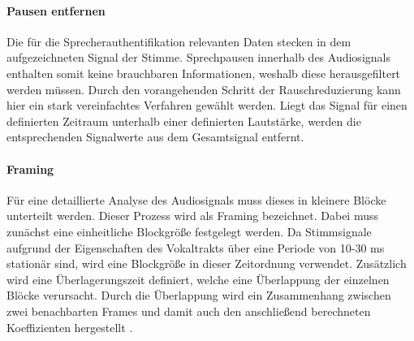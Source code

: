 \paragraph{Pausen entfernen}
Die für die Sprecherauthentifikation relevanten Daten stecken in dem aufgezeichneten Signal der Stimme.
Sprechpausen innerhalb des Audiosignals enthalten somit keine brauchbaren Informationen, weshalb diese herausgefiltert werden müssen.
Durch den vorangehenden Schritt der Rauschreduzierung kann hier ein stark vereinfachtes Verfahren gewählt werden.
Liegt das Signal für einen definierten Zeitraum unterhalb einer definierten Lautstärke, werden die entsprechenden Signalwerte aus dem Gesamtsignal entfernt.

\paragraph{Framing}\label{sec:Framing}
Für eine detaillierte Analyse des Audiosignals muss dieses in kleinere Blöcke unterteilt werden.
Dieser Prozess wird als Framing bezeichnet.
Dabei muss zunächst eine einheitliche Blockgröße festgelegt werden.
Da Stimmsignale aufgrund der Eigenschaften des Vokaltrakts über eine Periode von 10-30 ms stationär sind, wird eine Blockgröße in dieser Zeitordnung verwendet.
Zusätzlich wird eine Überlagerungszeit definiert, welche eine Überlappung der einzelnen Blöcke verursacht.
Durch die Überlappung wird ein Zusammenhang zwischen zwei benachbarten Frames und damit auch den anschließend berechneten Koeffizienten hergestellt \autocite[vgl.][S. 457]{richter_signal_2022}.


